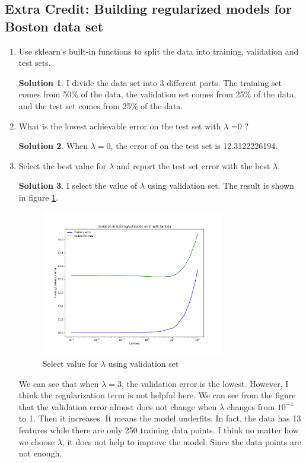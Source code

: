 \documentclass[]{book}
\theoremstyle{definition}
\newtheorem*{soln}{Solution}
\begin{document}
\subsection*{Extra Credit: Building regularized models for Boston data set}
\begin{enumerate}
	\item Use sklearn's built-in functions to split the data into training, validation and test sets. 
	\begin{soln}
		I divide the data set into 3 different parts. The training set comes from 50\% of the data, the validation set comes from 25\% of the data, and the test set comes from 25\% of the data.
	\end{soln}
	\item What is the lowest achievable error on the test set with  $\lambda$ =0  ?
	\begin{soln}
		When $\lambda = 0$, the error of on the test set is 12.3122226194.
	\end{soln}
	\item Select the best value for  $\lambda$  and report the test set error with the best $\lambda$.
	\begin{soln}
		I select the value of $\lambda$ using validation set. The result is shown in figure \ref{fig:select_lambda_1}.
		\begin{figure}[H]
			\centering
			\includegraphics[width=8cm]{imgs//select_lambda_1.pdf}
			\caption{Select value for $\lambda$ using validation set}
			\label{fig:select_lambda_1}
		\end{figure}
	We can see that when $\lambda = 3$, the validation error is the lowest. However, I think the regularization term is not helpful here. We can see from the figure that the validation error almost does not change when $\lambda$ changes from $10^{-4}$ to 1. Then it increases. It means the model underfits. In fact, the data has 13 features while there are only 250 training data points. I think no matter how we choose $\lambda$, it does not help to improve the model. Since the data points are not enough.  

\end{soln}
\end{enumerate}
\end{document}
